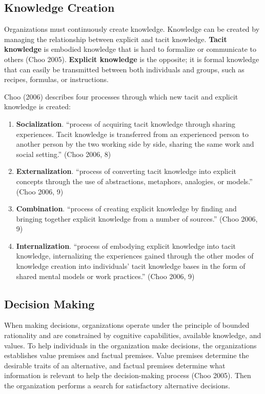 \documentclass[
  letterpaper,
  DIV=11,
  numbers=noendperiod]{scrreprt}
\providecommand{\tightlist}{%
  \setlength{\itemsep}{0pt}\setlength{\parskip}{0pt}}
\begin{document}
\subsection{Knowledge Creation}\label{knowledge-creation}

Organizations must continuously create knowledge. Knowledge can be
created by managing the relationship between explicit and tacit
knowledge. \textbf{Tacit knowledge} is embodied knowledge that is hard
to formalize or communicate to others (Choo 2005). \textbf{Explicit
knowledge} is the opposite; it is formal knowledge that can easily be
transmitted between both individuals and groups, such as recipes,
formulas, or instructions.

Choo (2006) describes four processes through which new tacit and
explicit knowledge is created:

\begin{enumerate}
\def\labelenumi{\arabic{enumi}.}
\tightlist
\item
  \textbf{Socialization}. ``process of acquiring tacit knowledge through
  sharing experiences. Tacit knowledge is transferred from an
  experienced person to another person by the two working side by side,
  sharing the same work and social setting.'' (Choo 2006, 8)
\item
  \textbf{Externalization}. ``process of converting tacit knowledge into
  explicit concepts through the use of abstractions, metaphors,
  analogies, or models.'' (Choo 2006, 9)
\item
  \textbf{Combination}. ``process of creating explicit knowledge by
  finding and bringing together explicit knowledge from a number of
  sources.'' (Choo 2006, 9)
\item
  \textbf{Internalization}. ``process of embodying explicit knowledge
  into tacit knowledge, internalizing the experiences gained through the
  other modes of knowledge creation into individuals' tacit knowledge
  bases in the form of shared mental models or work practices.'' (Choo
  2006, 9)
\end{enumerate}

\subsection{Decision Making}\label{decision-making}

When making decisions, organizations operate under the principle of
bounded rationality and are constrained by cognitive capabilities,
available knowledge, and values. To help individuals in the organization
make decisions, the organizations establishes value premises and factual
premises. Value premises determine the desirable traits of an
alternative, and factual premises determine what information is relevant
to help the decision-making process (Choo 2005). Then the organization
performs a search for satisfactory alternative decisions.
\end{document}
